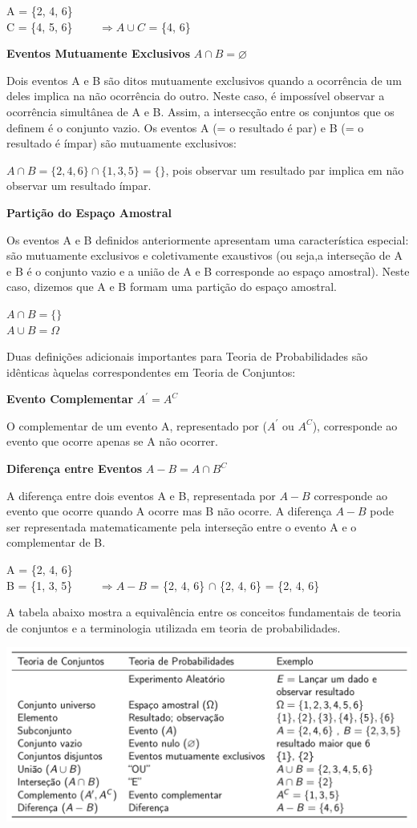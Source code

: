 \documentclass[
]{book}
\theoremstyle{definition}
\theoremstyle{definition}
\theoremstyle{definition}
\theoremstyle{remark}
\begin{document}
A = \{2, 4, 6\}\\
C = \{4, 5, 6\} \(\qquad \Rightarrow {A\cup C}\) = \{4, 6\}

\textbf{Eventos Mutuamente Exclusivos} \(A \cap B = \varnothing\)

Dois eventos A e B são ditos mutuamente exclusivos quando a ocorrência de um deles implica na não ocorrência do outro. Neste caso, é impossível observar a ocorrência simultânea de A e B. Assim, a intersecção entre os conjuntos que os definem é o conjunto vazio.
Os eventos A (= o resultado é par) e B (= o resultado é ímpar) são mutuamente exclusivos:

\(A \cap B = \{2, 4, 6\} \cap \{1, 3, 5\} = \{ \}\), pois observar um resultado par implica em não observar um resultado ímpar.

\textbf{Partição do Espaço Amostral}

Os eventos A e B definidos anteriormente apresentam uma característica especial: são mutuamente exclusivos e coletivamente exaustivos (ou seja,a interseção de A e B é o conjunto vazio e a união de A e B corresponde ao espaço amostral). Neste caso, dizemos que A e B formam uma partição do espaço amostral.

\(A \cap B = \{\}\)\\
\(A \cup B = \Omega\)

Duas definições adicionais importantes para Teoria de Probabilidades são idênticas àquelas correspondentes em Teoria de Conjuntos:

\textbf{Evento Complementar} \(A^\prime = A^C\)

O complementar de um evento A, representado por (\(A^\prime\) ou \(A^C\)), corresponde ao evento que ocorre apenas se A não ocorrer.

\textbf{Diferença entre Eventos} \(A - B = A \cap B^C\)

A diferença entre dois eventos A e B, representada por \(A-B\) corresponde ao evento que ocorre quando A ocorre mas B não ocorre.
A diferença \(A-B\) pode ser representada matematicamente pela interseção entre o evento A e o complementar de B.

A = \{2, 4, 6\}\\
B = \{1, 3, 5\} \(\qquad \Rightarrow {A - B}\) = \{2, 4, 6\} \(\cap\) \{2, 4, 6\} = \{2, 4, 6\}

A tabela abaixo mostra a equivalência entre os conceitos fundamentais de teoria de conjuntos e a terminologia utilizada em teoria de probabilidades.

\includegraphics[width=1\linewidth]{img/probabilidade-conjuntos}
\end{document}
